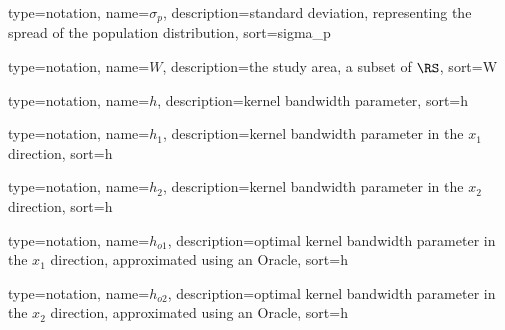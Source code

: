 {%
   type=notation,
   name={\ensuremath{\sigma_p}},
   description={standard deviation, representing the spread of the population distribution},
   sort={sigma_p}
}

{%
   type=notation,
   name={\ensuremath{W}},
   description={the study area, a subset of \ensuremath{\RS}},
   sort={W}
}

{%
   type=notation,
   name={\ensuremath{h}},
   description={kernel bandwidth parameter},
   sort={h}
}

{%
   type=notation,
   name={\ensuremath{h_1}},
   description={kernel bandwidth parameter in the \ensuremath{x_1} direction},
   sort={h}
}

{%
   type=notation,
   name={\ensuremath{h_2}},
   description={kernel bandwidth parameter in the \ensuremath{x_2} direction},
   sort={h}
}

{%
   type=notation,
   name={\ensuremath{h_{o1}}},
   description={optimal kernel bandwidth parameter in the \ensuremath{x_1} direction, approximated using an Oracle},
   sort={h}
}

{%
   type=notation,
   name={\ensuremath{h_{o2}}},
   description={optimal kernel bandwidth parameter in the \ensuremath{x_2} direction, approximated using an Oracle},
   sort={h}
}

